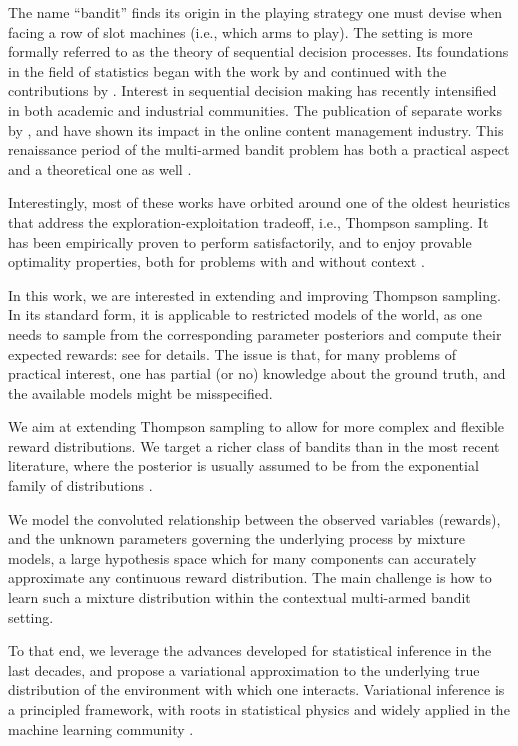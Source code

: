 \documentclass{article}
\newcommand{\ie}{i.e., }
\begin{document}
The name ``bandit'' finds its origin in the playing strategy one must devise when facing a row of slot machines (\ie which arms to play). The setting is more formally referred to as the theory of sequential decision processes. Its foundations in the field of statistics began with the work by \citet{j-Thompson1933,j-Thompson1935} and continued with the contributions by \citet{j-Robbins1952}. Interest in sequential decision making has recently intensified in both academic and industrial communities. The publication of separate works by \citet{ic-Chapelle2011}, and \citet{j-Scott2015} have shown its impact in the online content management industry. This renaissance period of the multi-armed bandit problem has both a practical aspect \cite{ip-Li2010} and a theoretical one as well \cite{j-Scott2010,ip-Agrawal2012,ip-Maillard2011}.

Interestingly, most of these works have orbited around one of the oldest heuristics that address the exploration-exploitation tradeoff, \ie Thompson sampling. It has been empirically proven to perform satisfactorily, and to enjoy provable optimality properties, both for problems with and without context \cite{ip-Agrawal2012,ip-Agrawal2013,ip-Agrawal2013a,ic-Korda2013,j-Russo2014,j-Russo2016}.

In this work, we are interested in extending and improving Thompson sampling. In its standard form, it is applicable to restricted models of the world, as one needs to sample from the corresponding parameter posteriors and compute their expected rewards: see \cite{j-Scott2010} for details. The issue is that, for many problems of practical interest, one has partial (or no) knowledge about the ground truth, and the available models might be misspecified. 

We aim at extending Thompson sampling to allow for more complex and flexible reward distributions. We target a richer class of bandits than in the most recent literature, where the posterior is usually assumed to be from the exponential family of distributions \cite{ic-Korda2013}.

We model the convoluted relationship between the observed variables (rewards), and the unknown parameters governing the underlying process by mixture models, a large hypothesis space which for many components can accurately approximate any continuous reward distribution. The main challenge is how to learn such a mixture distribution within the contextual multi-armed bandit setting.

To that end, we leverage the advances developed for statistical inference in the last decades, and propose a variational approximation to the underlying true distribution of the environment with which one interacts. Variational inference is a principled framework, with roots in statistical physics and widely applied in the machine learning community \cite{b-Bishop2006}.
\end{document}
